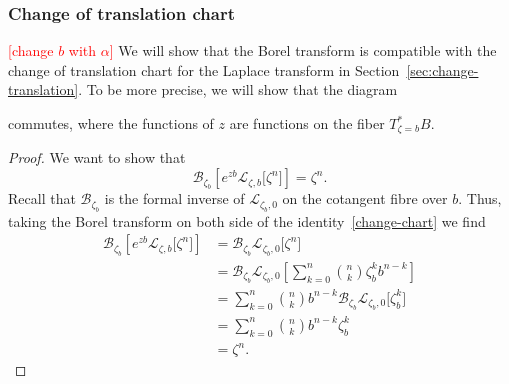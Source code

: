 \documentclass{article}
\newcommand{\C}{\mathbb{C}}
\newcommand{\laplace}{\mathcal{L}}
\newcommand{\borel}{\mathcal{B}}
\theoremstyle{definition}
\theoremstyle{plain}
\begin{document}
\subsubsection{Change of translation chart}\label{transl-borel}
\textcolor{red}{[change $b$ with $\alpha$]}
We will show that the Borel transform is compatible with the change of translation chart for the Laplace transform in Section~\ref{sec:change-translation}. To be more precise, we will show that the diagram
\begin{center}
\end{center}
commutes, where the functions of $z$ are functions on the fiber $T^*_{\zeta=b}B$. 
\begin{proof}
We want to show that 
\[\borel_{\zeta_b}\left[e^{zb} \laplace_{\zeta,b}\big[\zeta^n\big]\right]=\zeta^n.\]
Recall that $\borel_{\zeta_b}$
is the formal inverse of $\laplace_{\zeta_b,0}$ on the cotangent fibre over $b$. Thus, taking the Borel transform on both side of the identity~\eqref{change-chart} we find
  \begin{align*}
      \borel_{\zeta_b}\left[e^{zb} \laplace_{\zeta,b}\big[\zeta^n\big]\right]&=\borel_{\zeta_b}\laplace_{\zeta_b,0}\big[\zeta^n\big]\\
      &=\borel_{\zeta_b}\laplace_{\zeta_b,0}\left[\sum_{k=0}^n{n\choose k}\zeta_b^k b^{n-k}\right]\\
      &=\sum_{k=0}^n{n\choose k} b^{n-k}\borel_{\zeta_b}\laplace_{\zeta_b,0}\big[\zeta_b^k \big]\\
      &=\sum_{k=0}^n{n\choose k} b^{n-k}\zeta_b^k\\
      &=\zeta^n.
  \end{align*}
\end{proof}
\end{document}
